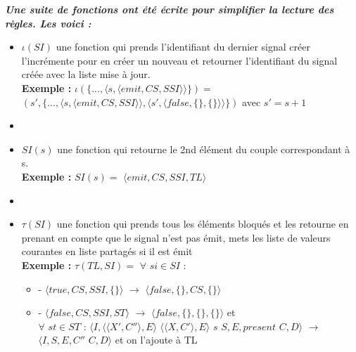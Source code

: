 \documentclass[10pt,a4paper]{article}
\begin{document}
					
				\textbf{\textit{Une suite de fonctions ont été écrite pour simplifier la lecture des règles. Les voici :}}
				\smallbreak
				\begin{itemize}
					\item[] $\iota(SI)$ une fonction qui prends l'identifiant du dernier signal créer l'incrémente pour en créer un nouveau et retourner l'identifiant du signal créée avec la liste mise à jour.
					\\ \textbf{Exemple :} $\iota(\{...,\langle s,\langle emit,CS,SSI\rangle\rangle\}) =$ $(s' ,\{...,\langle s,\langle emit,CS,SSI\rangle\rangle,\langle s',\langle false,\{\},\{\}\rangle\rangle\})$ avec $s' = s+1$
					\item[] 
					\item[] $SI(s)$ une fonction qui retourne le 2nd élément du couple correspondant à s.
					\\\textbf{Exemple :} $SI(s) =$ $\langle emit,CS,SSI,TL\rangle$
					\item[]  
					\item[] $\tau(SI)$ une fonction qui prends tous les éléments bloqués et les retourne en prenant en compte que le signal n'est pas émit, mets les liste de valeurs courantes en liste partagés si il est émit 
					\\ \textbf{Exemple :} $\tau(TL,SI) =$ $\forall$ $si \in SI$ : 
					\begin{itemize}
						\item[] - $\langle true,CS,SSI,\{\}\rangle$ $\rightarrow$ $\langle false,\{\},CS,\{\}\rangle$
						\item[] - $\langle false,CS,SSI,ST\rangle$ $\rightarrow$ $\langle false,\{\},\{\},\{\}\rangle$ et 
						\\$\forall$ $st \in ST$ : $\langle I,\langle\langle X',C''\rangle, E\rangle$ $\langle\langle X,C'\rangle, E\rangle$ $s$ $S,E,present$ $C,D\rangle$ $\rightarrow$ $ \langle I,S,E,C''$ $C,D\rangle$ et on l'ajoute à TL
					\end{itemize}
				\end{itemize}
				\bigbreak
				\bigbreak
					
					
					
\end{document}
